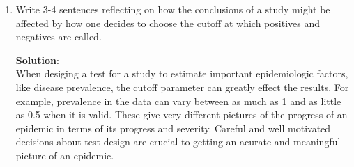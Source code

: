 \documentclass[11pt]{article}
\begin{document}
\begin{enumerate}
\begin{enumerate}[label=\alph*.]
	\item Write 3-4 sentences reflecting on how the conclusions of a study might be affected by how one decides to choose the cutoff at which positives and negatives are called. 
	
	\begin{tcolorbox}[breakable]
		\textbf{Solution}:\\
		When desiging a test for a study to estimate important epidemiologic factors, like disease prevalence, the cutoff parameter can greatly effect the results. For example, prevalence in the data can vary between as much as 1 and as little as 0.5 when it is valid. These give very different pictures of the progress of an epidemic in terms of its progress and severity. Careful and well motivated decisions about test design are crucial to getting an acurate and meaningful picture of an epidemic.
	\end{tcolorbox}
	
\end{enumerate}

\end{enumerate}
\end{document}
